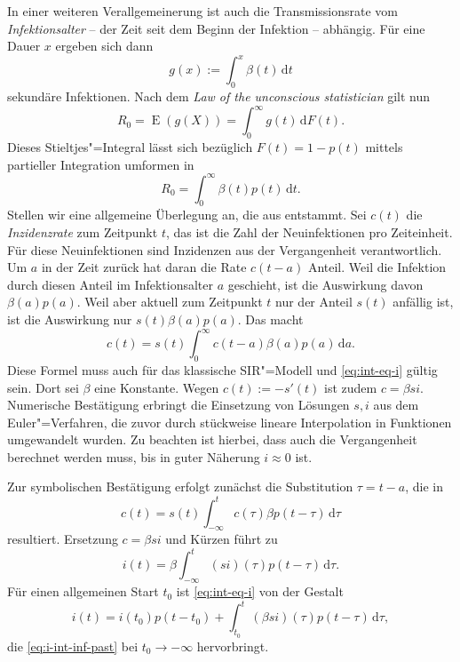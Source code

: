 \documentclass[a4paper,10pt,fleqn,twocolumn,twoside,dvipdfmx]{scrartcl}
\numberwithin{equation}{section}
\begin{document}
In einer weiteren Verallgemeinerung ist auch die Transmissionsrate
vom \emph{Infektionsalter} -- der Zeit seit dem Beginn der
Infektion -- abhängig. Für eine Dauer $x$ ergeben sich dann%
\begin{equation}
g(x) := \int_0^x \beta(t)\,\mathrm dt
\end{equation}
sekundäre Infektionen. Nach dem
\emph{Law of the unconscious statistician}
gilt nun%
\begin{equation}
R_0 = \operatorname{E}(g(X)) = \int_0^\infty g(t)\,\mathrm dF(t).
\end{equation}
Dieses Stieltjes"=Integral lässt sich bezüglich $F(t)=1-p(t)$
mittels partieller Integration umformen in%
\begin{equation}
R_0 = \int_0^\infty \beta(t)p(t)\,\mathrm dt.
\end{equation}
Stellen wir eine allgemeine Überlegung an, die aus \cite{Wallinga}
entstammt. Sei $c(t)$ die
\emph{Inzidenzrate} zum Zeitpunkt $t$, das ist die Zahl der
Neuinfektionen pro Zeiteinheit. Für diese Neuinfektionen sind
Inzidenzen aus der Vergangenheit verantwortlich. Um $a$ in der Zeit
zurück hat daran die Rate $c(t-a)$ Anteil. Weil die
Infektion durch diesen Anteil im Infektionsalter $a$ geschieht, ist
die Auswirkung davon $\beta(a)p(a)$. Weil aber aktuell zum Zeitpunkt
$t$ nur der Anteil $s(t)$ anfällig ist, ist die Auswirkung nur
$s(t)\beta(a)p(a)$. Das macht
\begin{equation}
c(t) = s(t)\int_0^\infty c(t-a)\beta(a)p(a)\,\mathrm da.
\end{equation}
Diese Formel muss auch für das klassische SIR"=Modell und
\eqref{eq:int-eq-i} gültig sein. Dort sei $\beta$ eine Konstante.
Wegen $c(t):=-s'(t)$ ist zudem $c=\beta si$. Numerische
Bestätigung erbringt die Einsetzung von Lösungen $s,i$
aus dem Euler"=Verfahren, die zuvor durch stückweise lineare
Interpolation in Funktionen umgewandelt wurden. Zu beachten ist
hierbei, dass auch die Vergangenheit berechnet werden muss, bis in
guter Näherung $i\approx 0$ ist.

Zur symbolischen Bestätigung erfolgt zunächst die Substitution
$\tau=t-a$, die in
\begin{equation}
c(t) = s(t)\int_{-\infty}^t c(\tau)\beta p(t-\tau)\,\mathrm d\tau
\end{equation}
resultiert. Ersetzung $c=\beta si$ und Kürzen führt zu
\begin{equation}\label{eq:i-int-inf-past}
i(t) = \beta\int_{-\infty}^t (si)(\tau) p(t-\tau)\,\mathrm d\tau.
\end{equation}
Für einen allgemeinen Start $t_0$ ist \eqref{eq:int-eq-i}
von der Gestalt
\begin{equation}
i(t) = i(t_0)p(t-t_0)+\int_{t_0}^t (\beta si)(\tau)p(t-\tau)\,\mathrm d\tau,
\end{equation}
die \eqref{eq:i-int-inf-past} bei $t_0\to -\infty$ hervorbringt.
\end{document}
